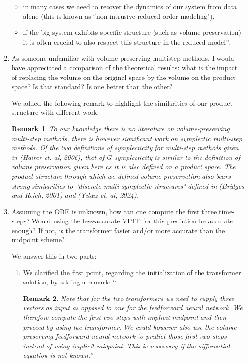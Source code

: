 \documentclass{article}
\newtheorem*{rmrk*}{Remark}
\begin{document}
\begin{enumerate}
{        \begin{itemize}
        \item[1. ] in many cases we need to recover the dynamics of our system from data alone (this is known as ``non-intrusive reduced order modeling"), 
        \item[2. ] if the big system exhibits specific structure (such as volume-preservation) it is often crucial to also respect this structure in the reduced model''.  
        \end{itemize}}

    \item As someone unfamiliar with volume-preserving multistep methods, I would have appreciated a comparison of the theoretical results: what is the impact of replacing the volume on the original space by the volume on the product space? Is that standard? Is one better than the other?
        {\color{mred} We added the following remark to highlight the similarities of our product structure with different work:
        
        \begin{rmrk*} 
            To our knowledge there is no literature on volume-preserving multi-step methods, there is however significant work on \textit{symplectic multi-step methods}. Of the two definitions of symplecticity for multi-step methods given in (Hairer et. al, 2006), that of \textit{\(G\)-symplecticity} is similar to the definition of volume preservation given here as it is also defined on a product space. The product structure through which we defined volume preservation also bears strong similarities to ``discrete multi-symplectic structures" defined in (Bridges and Reich, 2001) and (Y{\i}ld{\i}z et. al, 2024). 
        \end{rmrk*}

        }
    \item Assuming the ODE is unknown, how can one compute the first three time-steps? Would using the less-accurate VPFF for this prediction be accurate enough? If not, is the transformer faster and/or more accurate than the midpoint scheme?
        {\color{mred}
        We answer this in two parts:
        \begin{enumerate}
            \item We clarified the first point, regarding the initialization of the transformer solution, by adding a remark:
                ``\begin{rmrk*} Note that for the two transformers we need to supply three vectors as input as opposed to one for the feedforward neural network. We therefore compute the first two steps with implicit midpoint and then proceed by using the transformer. We could however also use the volume-preserving feedforward neural network to predict those first two steps instead of using implicit midpoint. This is necessary if the differential equation is not known.''\end{rmrk*}


\end{enumerate}}
\end{enumerate}
\end{document}
